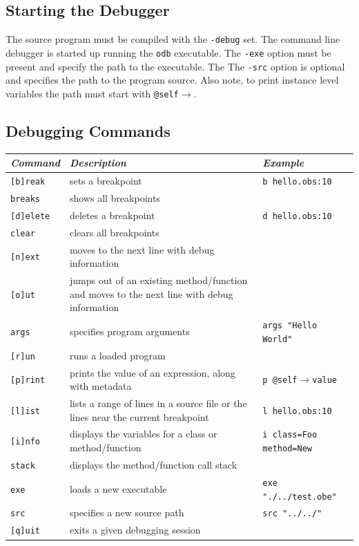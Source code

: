 \documentclass[12pt]{article}
\begin{document}
\subsection{Starting the Debugger}
The source program must be compiled with the \texttt{-debug} set. The command line debugger is started up running the \texttt{odb} executable. The \texttt{-exe} option must be present and specify the path to the executable.  The The \texttt{-src} option is optional and specifies the path to the program source.  Also note, to print instance level variables the path must start with \texttt{@self$\rightarrow$}. 

\subsection{Debugging Commands}
\begin{center}
\begin{tabular}{| l |p{4 cm} |p{6 cm} |}
\hline
\emph{Command} & \emph{Description} & \emph{Example} \\ \hline \hline
\texttt{[b]reak} &  sets a breakpoint & \texttt{b hello.obs:10} \\ \hline
\texttt{breaks} &  shows all breakpoints &  \\ \hline
\texttt{[d]elete} &  deletes a breakpoint & \texttt{d hello.obs:10} \\ \hline
\texttt{clear} &  clears all breakpoints &  \\ \hline
\texttt{[n]ext} &  moves to the next line with debug information &  \\ \hline
\texttt{[o]ut} &  jumps out of an existing method/function and moves to the next line with debug information &  \\ \hline
\texttt{args} &  specifies program arguments & \texttt{args "Hello World"} \\ \hline
\texttt{[r]un} &  runs a loaded program &  \\ \hline
\texttt{[p]rint} &  prints the value of an expression, along with metadata & \texttt{p @self$\rightarrow$value} \\ \hline
\texttt{[l]ist} &  lists a range of lines in a source file or the lines near the current breakpoint & \texttt{l hello.obs:10} \\ \hline
\texttt{[i]nfo} &  displays the variables for a class or method/function & \texttt{i class=Foo method=New} \\ \hline
\texttt{stack} &  displays the method/function call stack &  \\ \hline
\texttt{exe} &  loads a new executable & \texttt{exe "./../test.obe"} \\ \hline
\texttt{src} &  specifies a new source path & \texttt{src "../../"} \\ \hline
\texttt{[q]uit} &  exits a given debugging session &  \\ \hline
\end{tabular}
\end{center}
\end{document}
